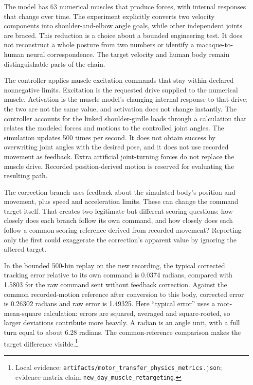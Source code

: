 The model has 63 numerical muscles that produce forces, with internal responses that change over time. The experiment explicitly converts two velocity components into shoulder-and-elbow angle goals, while other independent joints are braced. This reduction is a choice about a bounded engineering test. It does not reconstruct a whole posture from two numbers or identify a macaque-to-human neural correspondence. The target velocity and human body remain distinguishable parts of the chain.

The controller applies muscle excitation commands that stay within declared nonnegative limits. Excitation is the requested drive supplied to the numerical muscle. Activation is the muscle model's changing internal response to that drive; the two are not the same value, and activation does not change instantly. The controller accounts for the linked shoulder-girdle loads through a calculation that relates the modeled forces and motions to the controlled joint angles. The simulation updates 500 times per second. It does not obtain success by overwriting joint angles with the desired pose, and it does not use recorded movement as feedback. Extra artificial joint-turning forces do not replace the muscle drive. Recorded position-derived motion is reserved for evaluating the resulting path.

The correction branch uses feedback about the simulated body's position and movement, plus speed and acceleration limits. These can change the command target itself. That creates two legitimate but different scoring questions: how closely does each branch follow its own command, and how closely does each follow a common scoring reference derived from recorded movement? Reporting only the first could exaggerate the correction's apparent value by ignoring the altered target.

In the bounded 500-bin replay on the new recording, the typical corrected tracking error relative to its own command is 0.0374 radians, compared with 1.5803 for the raw command sent without feedback correction. Against the common recorded-motion reference after conversion to this body, corrected error is 0.26302 radians and raw error is 1.49325. Here ``typical error'' uses a root-mean-square calculation: errors are squared, averaged and square-rooted, so larger deviations contribute more heavily. A radian is an angle unit, with a full turn equal to about 6.28 radians. The common-reference comparison makes the target difference visible.\footnote{Local evidence: \texttt{artifacts/motor\_transfer\_physics\_metrics.json}; evidence-matrix claim \texttt{new\_day\_muscle\_retargeting}.}

